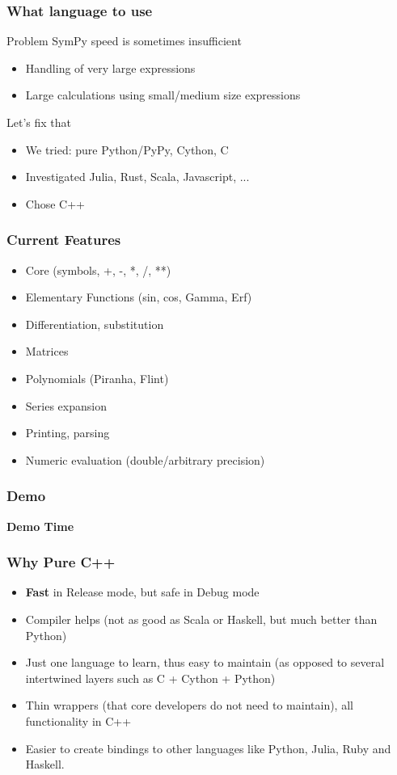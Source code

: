 \documentclass{beamer}
\begin{document}
\begin{frame}
\frametitle{What language to use}
\begin{block}{Problem}
SymPy speed is sometimes insufficient
\begin{itemize}
\item Handling of very large expressions
\item Large calculations using small/medium size expressions
\end{itemize}
\end{block}

\begin{block}{Let's fix that}
\begin{itemize}
\item We tried: pure Python/PyPy, Cython, C
\item Investigated Julia, Rust, Scala, Javascript, ...
\item Chose C++
\end{itemize}
\end{block}
\end{frame}




\begin{frame}
\frametitle{Current Features}
\begin{itemize}
    \item Core (symbols, +, -, *, /, **)
    \item Elementary Functions (sin, cos, Gamma, Erf)
    \item Differentiation, substitution
    \item Matrices
    \item Polynomials (Piranha, Flint)
    \item Series expansion
    \item Printing, parsing
    \item Numeric evaluation (double/arbitrary precision)
\end{itemize}
\end{frame}

\begin{frame}
\frametitle{Demo}
{\Large\bf Demo Time}
\end{frame}


\begin{frame}
\frametitle{Why Pure C++}
\begin{itemize}
\item \textbf{Fast} in Release mode, but safe in Debug mode
\item Compiler helps (not as good as Scala or Haskell, but much better than
    Python)
\item Just one language to learn, thus easy to maintain (as opposed to several
    intertwined layers such as C + Cython + Python)
\item Thin wrappers (that core developers do not need to maintain), all functionality in C++
\item Easier to create bindings to other languages like Python, Julia, Ruby and Haskell.
\end{itemize}
\end{frame}
\end{document}
